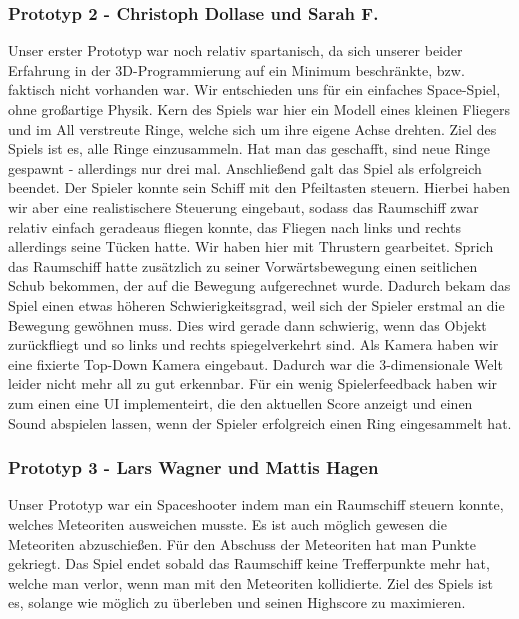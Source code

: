 \documentclass[10pt]{article}
\begin{document}
\subsubsection{Prototyp 2 - Christoph Dollase und Sarah F.}
Unser erster Prototyp war noch relativ spartanisch, da sich unserer beider Erfahrung in der 3D-Programmierung auf ein Minimum beschränkte, bzw. faktisch nicht vorhanden war. Wir entschieden uns für ein einfaches Space-Spiel, ohne großartige Physik. Kern des Spiels war hier ein Modell eines kleinen Fliegers und im All verstreute Ringe, welche sich um ihre eigene Achse drehten. Ziel des Spiels ist es, alle Ringe einzusammeln. Hat man das geschafft, sind neue Ringe gespawnt - allerdings nur drei mal. Anschließend galt das Spiel als erfolgreich beendet. \newline
Der Spieler konnte sein Schiff mit den Pfeiltasten steuern. Hierbei haben wir aber eine realistischere Steuerung eingebaut, sodass das Raumschiff zwar relativ einfach geradeaus fliegen konnte, das Fliegen nach links und rechts allerdings seine Tücken hatte. Wir haben hier mit \glqq Thrustern\grqq{} gearbeitet. Sprich das Raumschiff hatte zusätzlich zu seiner Vorwärtsbewegung einen seitlichen Schub bekommen, der auf die Bewegung aufgerechnet wurde. Dadurch bekam das Spiel einen etwas höheren Schwierigkeitsgrad, weil sich der Spieler erstmal an die Bewegung gewöhnen muss. Dies wird gerade dann schwierig, wenn das Objekt zurückfliegt und so links und rechts spiegelverkehrt sind.
Als Kamera haben wir eine fixierte Top-Down Kamera eingebaut.
Dadurch war die 3-dimensionale Welt leider nicht mehr all zu gut erkennbar.
Für ein wenig Spielerfeedback haben wir zum einen eine UI implementeirt, die den aktuellen Score anzeigt und einen Sound abspielen lassen, wenn der Spieler erfolgreich einen Ring eingesammelt hat.

\vspace{0.5cm}
\subsubsection{Prototyp 3 - Lars Wagner und Mattis Hagen}
Unser Prototyp war ein Spaceshooter indem man ein Raumschiff steuern konnte, welches Meteoriten ausweichen musste.
Es ist auch möglich gewesen die Meteoriten abzuschießen. Für den Abschuss der Meteoriten hat man Punkte gekriegt. Das Spiel endet
sobald das Raumschiff keine Trefferpunkte mehr hat, welche man verlor, wenn man mit den Meteoriten kollidierte. Ziel des Spiels ist es,
solange wie möglich zu überleben und seinen Highscore zu maximieren.
\end{document}
